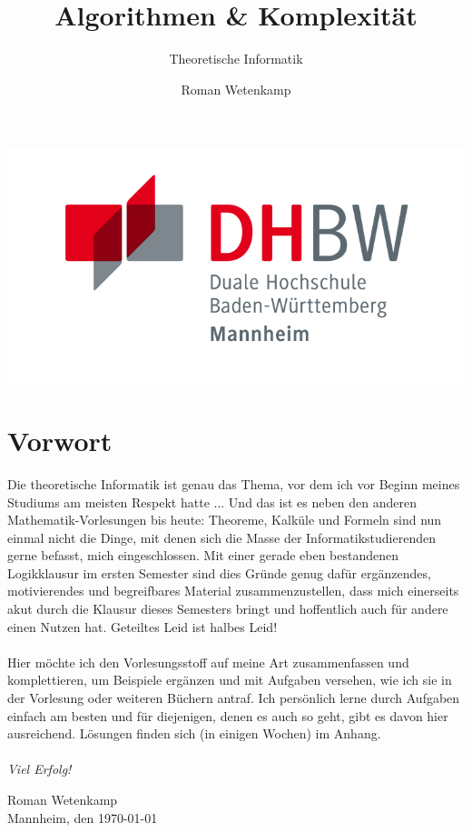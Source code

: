 \documentclass[11pt,a4paper]{scrartcl}
\author{Roman Wetenkamp}
\title{Algorithmen \& Komplexität}
\subtitle{Theoretische Informatik}
\begin{document}
\vspace{3cm}
\maketitle
\begin{center}
\includegraphics[scale=0.7]{DHBW.jpg}
\end{center}
\pagebreak
\tableofcontents
\pagebreak
\section*{Vorwort}
Die theoretische Informatik ist genau das Thema, vor dem ich vor Beginn meines Studiums am meisten Respekt hatte ... Und das ist es neben den anderen Mathematik-Vorlesungen bis heute: Theoreme, Kalküle und Formeln sind nun einmal nicht die Dinge, mit denen sich die Masse der Informatikstudierenden gerne befasst, mich eingeschlossen. Mit einer  gerade eben bestandenen Logikklausur im ersten Semester sind dies Gründe genug dafür ergänzendes, motivierendes und begreifbares Material zusammenzustellen, dass mich einerseits akut durch die Klausur dieses Semesters bringt und hoffentlich auch für andere einen Nutzen hat. Geteiltes Leid ist halbes Leid! \\\\
Hier möchte ich den Vorlesungsstoff auf meine Art zusammenfassen und komplettieren, um Beispiele ergänzen und mit Aufgaben versehen, wie ich sie in der Vorlesung oder weiteren Büchern antraf. Ich persönlich lerne durch Aufgaben einfach am besten und für diejenigen, denen es auch so geht, gibt es davon hier ausreichend. Lösungen finden sich (in einigen Wochen) im Anhang. \\\\
\textit{Viel Erfolg!}  \\
\begin{flushright}
Roman Wetenkamp \\
Mannheim, den \today
\end{flushright}  
\vfill
\end{document}
